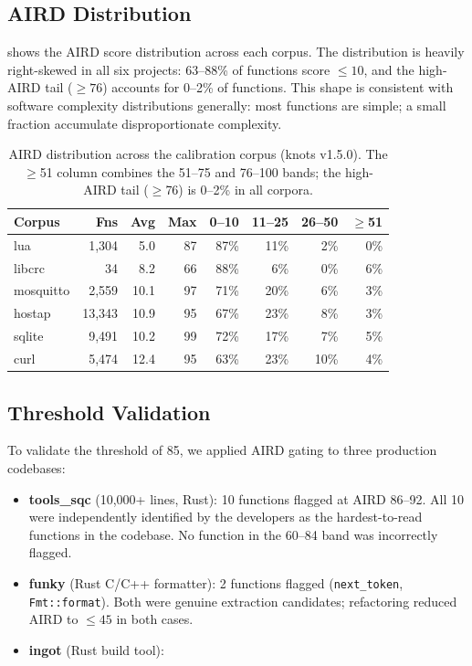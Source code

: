 \documentclass[10pt,twocolumn,letterpaper]{article}
\begin{document}
\subsection{AIRD Distribution}

 shows the AIRD score distribution across each
corpus.  The distribution is heavily right-skewed in all six projects:
63--88\% of functions score $\leq 10$, and the high-AIRD tail
($\geq 76$) accounts for 0--2\% of functions.  This shape is consistent
with software complexity distributions generally: most functions are
simple; a small fraction accumulate disproportionate complexity.

\begin{table}[t]
\centering
\footnotesize
\begin{tabular}{@{}lrrrrrrr@{}}
\toprule
\textbf{Corpus} & \textbf{Fns} & \textbf{Avg} & \textbf{Max}
  & \textbf{0--10} & \textbf{11--25} & \textbf{26--50}
  & \textbf{$\geq$51} \\
\midrule
lua       & 1{,}304  &  5.0 &  87 & 87\% & 11\% & 2\% & 0\% \\
libcrc    &     34   &  8.2 &  66 & 88\% &  6\% & 0\% & 6\% \\
mosquitto & 2{,}559  & 10.1 &  97 & 71\% & 20\% & 6\% & 3\% \\
hostap    & 13{,}343 & 10.9 &  95 & 67\% & 23\% & 8\% & 3\% \\
sqlite    &  9{,}491 & 10.2 &  99 & 72\% & 17\% & 7\% & 5\% \\
curl      &  5{,}474 & 12.4 &  95 & 63\% & 23\% & 10\% & 4\% \\
\bottomrule
\end{tabular}
\caption{AIRD distribution across the calibration corpus (knots v1.5.0).
The $\geq$51 column combines the 51--75 and 76--100 bands; the high-AIRD
tail ($\geq$76) is 0--2\% in all corpora.}
\label{tab:aird-dist}
\end{table}

\subsection{Threshold Validation}

To validate the threshold of 85, we applied AIRD gating to three
production codebases:

\begin{itemize}
    \item \textbf{tools\_sqc} (10,000+ lines, Rust): 10 functions flagged
        at AIRD 86--92.  All 10 were independently identified by the
        developers as the hardest-to-read functions in the codebase.
        No function in the 60--84 band was incorrectly flagged.
    \item \textbf{funky} (Rust C/C++ formatter): 2 functions flagged
        (\texttt{next\_token}, \texttt{Fmt::format}).  Both were genuine
        extraction candidates; refactoring reduced AIRD to $\leq 45$
        in both cases.
    \item \textbf{ingot} (Rust build tool): %
\end{itemize}
\end{document}

